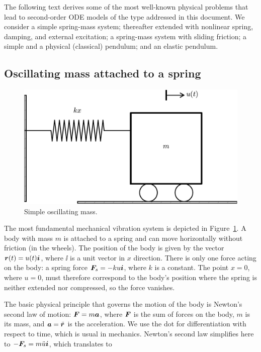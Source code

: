 \documentclass[%
oneside,                 %
final,                   %
10pt]{article}
\begin{document}
The following text derives some of the most well-known physical problems
that lead to
second-order ODE models of the type addressed in this document.
We consider a simple spring-mass system; thereafter extended with
nonlinear spring, damping, and external excitation; a spring-mass system
with sliding friction; a simple and a physical (classical) pendulum;
and an elastic pendulum.

\subsection{Oscillating mass attached to a spring}
\label{vib:app:mass_spring}


\begin{figure}[!ht]  %
  \centerline{\includegraphics[width=0.7\linewidth]{fig-vib/oscillator_spring.pdf}}
  \caption{
  Simple oscillating mass. \label{vib:app:mass_spring:fig}
  }
\end{figure}


The most fundamental mechanical vibration system is depicted in Figure~\ref{vib:app:mass_spring:fig}. A body with mass $m$ is attached to a
spring and can move horizontally without friction (in the wheels). The
position of the body is given by the vector $\rpos(t) = u(t)\ii$, where
$\ii$ is a unit vector in $x$ direction.
There is
only one force acting on the body: a spring force $\F_s =-ku\ii$, where
$k$ is a constant. The point $x=0$, where $u=0$, must therefore
correspond to the body's position
where the spring is neither extended nor compressed, so the force
vanishes.

The basic physical principle that governs the motion of the body is
Newton's second law of motion: $\F=m\acc$, where
$\F$ is the sum of forces on the body, $m$ is its mass, and $\acc=\ddot\rpos$
is the acceleration. We use the dot for differentiation with respect
to time, which is
usual in mechanics. Newton's second law simplifies here
to $-\F_s=m\ddot u\ii$, which translates to
\end{document}
